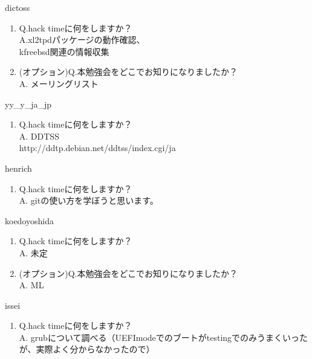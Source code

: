 \begin{prework}{ dictoss }
  \begin{enumerate}
  \item Q.hack timeに何をしますか？\\
    A.xl2tpdパッケージの動作確認、\\
     kfreebsd関連の情報収集
  \item (オプション)Q.本勉強会をどこでお知りになりましたか？\\
    A. メーリングリスト
  \end{enumerate}
\end{prework}

\begin{prework}{ yy\_y\_ja\_jp }
  \begin{enumerate}
  \item Q.hack timeに何をしますか？\\
    A. DDTSS\\
    http://ddtp.debian.net/ddtss/index.cgi/ja
  \end{enumerate}
\end{prework}

\begin{prework}{ henrich }
  \begin{enumerate}
  \item Q.hack timeに何をしますか？\\
    A. gitの使い方を学ぼうと思います。
  \end{enumerate}
\end{prework}

\begin{prework}{ koedoyoshida }
  \begin{enumerate}
  \item Q.hack timeに何をしますか？\\
    A. 未定
  \item (オプション)Q.本勉強会をどこでお知りになりましたか？\\
    A. ML
  \end{enumerate}
\end{prework}

\begin{prework}{ issei }
  \begin{enumerate}
  \item Q.hack timeに何をしますか？\\
    A. grubについて調べる（UEFImodeでのブートがtestingでのみうまくいったが、実際よく分からなかったので）
  \end{enumerate}
\end{prework}


